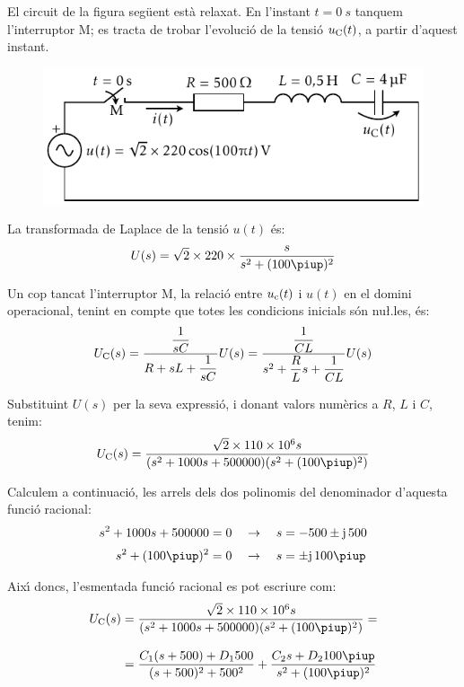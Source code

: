 \begin{exemple}
El circuit de la figura seg\"{u}ent est\`{a} relaxat. En l'instant $t=\SI{0}{s}$
tanquem l'interruptor M; es tracta de trobar l'evoluci\'{o} de la tensi\'{o}
$u_\mathrm{C}(t)$, a partir d'aquest instant.
\begin{figure}[h]
\centering
    \includegraphics{Imatges/Cap-Laplace-Exemple4-Circuit.pdf}
\end{figure}


La transformada de Laplace de la tensi\'{o} $u(t)$ \'{e}s:
\[
    U(s) = \sqrt{2}\times 220\times \frac{s}{s^2 + (100\piup)^2}
\]

\break
Un cop tancat l'interruptor M, la relaci\'{o} entre $u_\mathrm{c}(t)$ i
$u(t)$ en el domini operacional, tenint en compte que totes les
condicions inicials s\'{o}n nu{\l.l}es, \'{e}s:
\[
    U_\mathrm{C}(s) = \frac{\dfrac{1}{sC}}{R+ sL +\dfrac{1}{sC}} U(s)=
    \frac{\dfrac{1}{CL}}{s^2 + \dfrac{R}{L}s +\dfrac{1}{CL}} U(s)
\]

Substituint $U(s)$ per la seva expressi\'{o}, i donant valors num\`{e}rics a
$R$, $L$ i $C$, tenim:
\[
    U\ped{C}(s) = \frac{\sqrt{2}\times 110\times 10^6 s}{(s^2 + 1000 s + 500000)(s^2 + (100\piup)^2)}
\]

Calculem a continuaci\'{o}, les arrels dels dos polinomis  del
denominador d'aquesta funci\'{o} racional:
\begin{align*}
    s^2 + 1000 s + 500000 &= 0 \quad\rightarrow\quad s = -500
    \pm\ju\,500 \\[0.5ex]
    s^2 + (100\piup)^2 &= 0 \quad\rightarrow\quad s = \pm\ju\,100\piup
\end{align*}

Aix\'{\i} doncs, l'esmentada funci\'{o} racional es pot escriure com:
\[\begin{split}
U\ped{C}(s) &= \frac{\sqrt{2}\times 110\times 10^6 s}{(s^2 + 1000 s +
500000)(s^2 + (100\piup)^2)}  = \\[2ex] &= \frac{C_1 (s+500) + D_1
500}{(s+500)^2+500^2} + \frac{C_2 s + D_2 100 \piup}{s^2 +(100\piup)^2}
\end{split}\]



\end{exemple}
